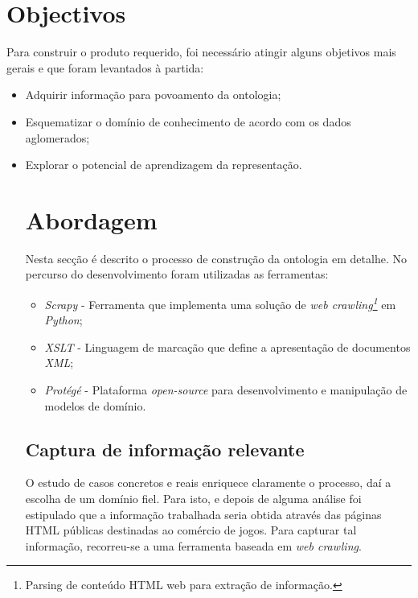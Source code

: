 \documentclass[a4paper,11pt]{article}
\theoremstyle{mytheor}
\begin{document}
\section{Objectivos}
Para construir o produto requerido, foi necessário atingir alguns objetivos mais gerais e que foram levantados à partida:
\begin{itemize}
\item Adquirir informação para povoamento da ontologia;
\item Esquematizar o domínio de conhecimento de acordo com os dados aglomerados;
\item Explorar o potencial de aprendizagem da representação.
\newpage
\section{Abordagem}
Nesta secção é descrito o processo de construção da ontologia em detalhe. No percurso do desenvolvimento foram utilizadas as ferramentas:
\begin{itemize}
\item \textit{Scrapy} - Ferramenta que implementa uma solução de \textit{web crawling\footnote{Parsing de conteúdo HTML web para extração de informação.}} em \textit{Python};
\item \textit{XSLT} - Linguagem de marcação que define a apresentação de documentos \textit{XML};
\item \textit{Protégé} - Plataforma \textit{open-source} para desenvolvimento e manipulação de modelos de domínio.
\end{itemize}

\subsection{Captura de informação relevante}
O estudo de casos concretos e reais enriquece claramente o processo, daí a escolha de um domínio fiel. Para isto, e depois de alguma análise foi estipulado que a informação trabalhada seria obtida através das páginas HTML públicas destinadas ao comércio de jogos.
Para capturar tal informação, recorreu-se a uma ferramenta baseada em \textit{web crawling}. 



\end{itemize}
\end{document}
